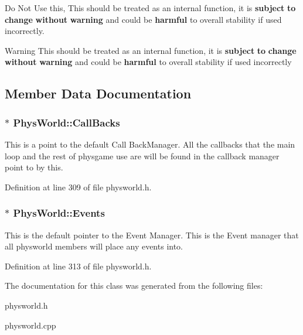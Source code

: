 Do Not Use this, This should be treated as an internal function, it is {\bfseries subject} {\bfseries to} {\bfseries change} {\bfseries without} {\bfseries warning} and could be {\bfseries harmful} to overall stability if used incorrectly. \begin{DoxyWarning}{Warning}
This should be treated as an internal function, it is {\bfseries subject} {\bfseries to} {\bfseries change} {\bfseries without} {\bfseries warning} and could be {\bfseries harmful} to overall stability if used incorrectly 
\end{DoxyWarning}


\subsection{Member Data Documentation}
\hypertarget{classPhysWorld_a080ea6f1584374b07d3c1f29c7ed64df}{
\subsubsection[{CallBacks}]{$\ast$ {\bf PhysWorld::CallBacks}}}
\label{db/df5/classPhysWorld_a080ea6f1584374b07d3c1f29c7ed64df}


This is a point to the default Call BackManager. All the callbacks that the main loop and the rest of physgame use are will be found in the callback manager point to by this. 

Definition at line 309 of file physworld.h.\hypertarget{classPhysWorld_a601b3c6093aaf2a69fcd3311dde9aadc}{
\subsubsection[{Events}]{$\ast$ {\bf PhysWorld::Events}}}
\label{db/df5/classPhysWorld_a601b3c6093aaf2a69fcd3311dde9aadc}


This is the default pointer to the Event Manager. This is the Event manager that all physworld members will place any events into. 

Definition at line 313 of file physworld.h.

The documentation for this class was generated from the following files:\begin{DoxyCompactItemize}
\item 
physworld.h\item 
physworld.cpp\end{DoxyCompactItemize}
